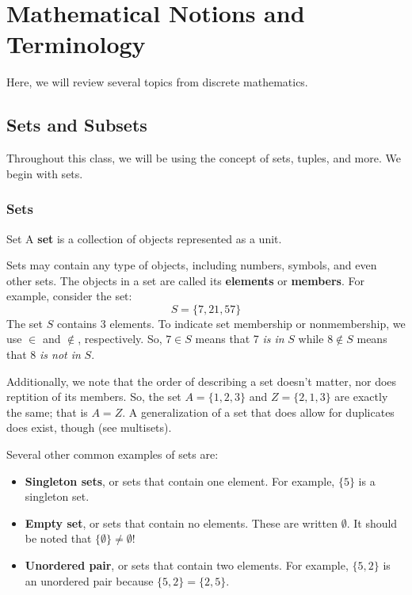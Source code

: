 \documentclass[letterpaper]{article}
\begin{document}
\newpage
{}

\section{Mathematical Notions and Terminology}
Here, we will review several topics from discrete mathematics. 

\subsection{Sets and Subsets}
Throughout this class, we will be using the concept of sets, tuples, and more. We begin with sets. 

\subsubsection{Sets}
\begin{definition}{Set}{}
    A \textbf{set} is a collection of objects represented as a unit.
\end{definition}
Sets may contain any type of objects, including numbers, symbols, and even other sets. The objects in a set are called its \textbf{elements} or \textbf{members}. For example, consider the set:
\[S = \{7, 21, 57\}\]
The set $S$ contains 3 elements. To indicate set membership or nonmembership, we use $\in$ and $\notin$, respectively. So, $7 \in S$ means that 7 \emph{is in} $S$ while $8 \notin S$ means that 8 \emph{is not in} $S$. 

\bigskip 

Additionally, we note that the order of describing a set doesn't matter, nor does reptition of its members. So, the set $A = \{1, 2, 3\}$ and $Z = \{2, 1, 3\}$ are exactly the same; that is $A = Z$. A generalization of a set that does allow for duplicates does exist, though (see multisets).  

\bigskip

Several other common examples of sets are:
\begin{itemize}
    \item \textbf{Singleton sets}, or sets that contain one element. For example, $\{5\}$ is a singleton set. 
    \item \textbf{Empty set}, or sets that contain no elements. These are written $\emptyset$. It should be noted that $\{\emptyset\} \neq \emptyset$!
    \item \textbf{Unordered pair}, or sets that contain two elements. For example, $\{5, 2\}$ is an unordered pair because $\{5, 2\} = \{2, 5\}$. 
\end{itemize}
\end{document}
